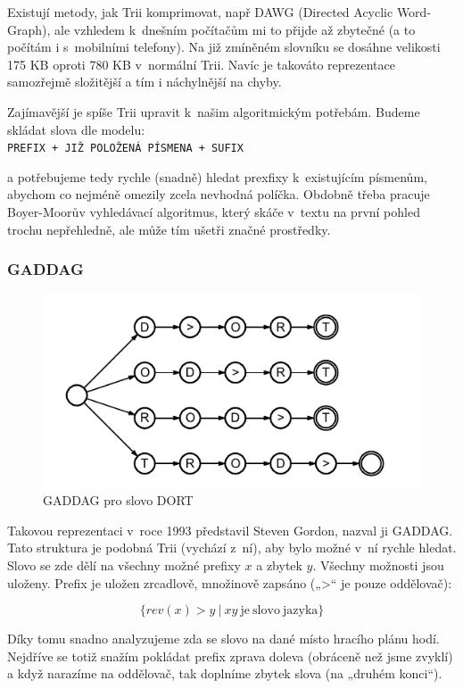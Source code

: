 \documentclass[a4paper]{article}
\begin{document}
Existují metody, jak Trii komprimovat, např DAWG (Directed Acyclic Word-Graph), ale vzhledem k~dnešním počítačům mi to přijde až zbytečné (a to počítám i s~mobilními telefony). Na již zmíněném slovníku se dosáhne velikosti 175 KB oproti 780 KB v~normální Trii. Navíc je takováto reprezentace samozřejmě složitější a tím i náchylnější na chyby. 

Zajímavější je spíše Trii upravit k~našim algoritmickým potřebám. Budeme skládat slova dle modelu:\\
\texttt{PREFIX + JIŽ POLOŽENÁ PÍSMENA + SUFIX}

a potřebujeme tedy rychle (snadně) hledat prexfixy k~existujícím písmenům, abychom co nejméně omezily zcela nevhodná políčka. Obdobně třeba pracuje Boyer-Moorův vyhledávací algoritmus, který skáče v~textu na první pohled trochu nepřehledně, ale může tím ušetři značné prostředky.

\subsubsection{GADDAG}
 \begin{figure}[hb]
 \centering
\includegraphics{pic/gaddag-dort.pdf}
\caption{GADDAG pro slovo DORT}
\label{gaddag-dort}
\end{figure}
Takovou reprezentaci v~roce 1993 představil Steven Gordon, nazval ji GADDAG. Tato struktura je podobná Trii (vychází z~ní), aby bylo možné v~ní rychle hledat. Slovo se zde dělí na všechny možné prefixy $x$ a zbytek $y$. Všechny možnosti jsou uloženy. Prefix je uložen zrcadlově, množinově zapsáno („>“ je pouze oddělovač):

$$\{ rev(x)>y\ |\ xy \mathrm{\ je\ slovo\ jazyka}\}$$

Díky tomu snadno analyzujeme zda se slovo na dané místo hracího plánu hodí. Nejdříve se totiž snažím pokládat prefix zprava doleva (obráceně než jsme zvyklí) a když narazíme na oddělovač, tak doplníme zbytek slova (na „druhém konci“). 
\end{document}
